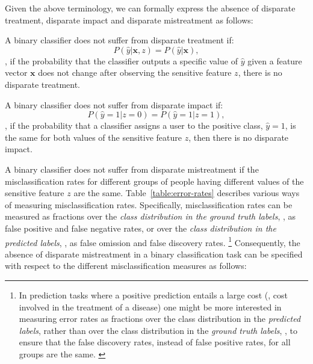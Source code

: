 \documentclass[letterpaper]{sig-alternate-2013}
\newcommand{\disc}{disparate mistreatment}
\begin{document}
Given the above terminology, we can formally express the absence of disparate treatment, disparate impact and \disc{} as
follows:

\vspace{2mm}
 A binary classifier does not suffer from disparate treatment if:
\begin{equation} \label{eq:disparate_treatment}
P(\hat{y} | \mathbf{x}, z) = P(\hat{y} | \mathbf{x}),
\end{equation}
\ie, if the probability that the classifier outputs a specific value of $\hat{y}$ given a feature vector $\mathbf{x}$ does not change after observing
the sensitive feature $z$, there is no disparate treatment.

\vspace{2mm}
 A binary classifier does not suffer from disparate impact if:
\begin{equation} \label{eq:disparate_impact}
P(\hat{y} = 1 | z = 0) = P(\hat{y} = 1 | z = 1),
\end{equation}
\ie, if the probability that a classifier assigns a user to the positive class, $\hat{y} = 1$, is the same for both values of the sensitive feature
$z$, then there is no disparate impact.

\vspace{2mm}
A binary classifier does not suffer from \disc{}  if the misclassification rates for different groups of people having different values of the sensitive feature $z$ are the same. Table~\ref{table:error-rates} describes various ways of measuring misclassification rates.
Specifically, misclassification rates can be measured as fractions over the \textit{class distribution in the ground truth labels}, \ie, as false positive and false negative rates, or over the \textit{class distribution in the predicted labels}, \ie, as false omission and false discovery rates.
\footnote{
\scriptsize{
In prediction tasks where a positive prediction entails a large cost (\eg, cost involved in the treatment of a disease)
one might be more interested in measuring error rates as fractions over the class distribution in the \textit{predicted labels}, rather than over the class distribution in the \textit{ground truth labels}, \eg, to ensure that the false discovery rates, instead of false positive rates, for all groups are the same.
}
}
Consequently, the absence of \disc{} in a binary
classification task can be specified with respect to the different misclassification measures as follows:\\
\end{document}
